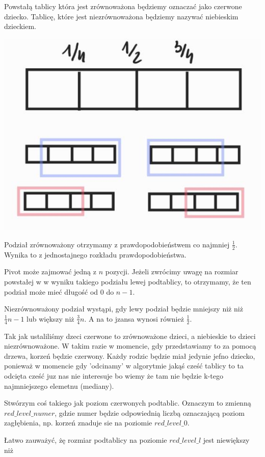 \documentclass[12pt]{article}
\begin{document}
Powstałą tablicy która jest zrównoważona będziemy oznaczać jako czerwone dziecko.
Tablicę, które jest niezrównoważona będziemy nazywać niebieskim dzieckiem.

\includegraphics[scale=0.5]{zad4_2.png}

Podział zrównoważony otrzymamy z prawdopodobieństwem co najmniej $\frac{1}{2}$. 
Wynika to z jednostajnego rozkładu prawdopodobieństwa. 

Pivot może zajmować jedną z $n$ pozycji. Jeżeli zwrócimy uwagę na rozmiar powstałej w w wyniku takiego podziału lewej podtablicy, to otrzymamy, że ten podział może mieć długość od $0$ do $n-1$.

Niezrównoważony podział wystąpi, gdy lewy podział będzie mniejszy niż niż $\frac{1}{4}n-1$ lub większy niż $\frac{3}{4}n$. A na to jzansa wynosi również $\frac{1}{2}$.

Tak jak ustaliliśmy dzeci czerwone to zrównoważone dzieci, a niebieskie to dzieci niezrównoważone. W takim razie w momencie, gdy przedstawiamy to za pomocą drzewa, korzeń będzie czerwony. Każdy rodzic będzie miał jedynie jefno dziecko, ponieważ w momencie gdy 'odcinamy' w algorytmie jakąś cześć tablicy to ta odcięta cześć juz nas nie interesuje bo wiemy że tam nie będzie k-tego najmniejszego elemetnu (mediany).

Stwórzym coś takiego jak poziom czerwonych podtablic.
Oznaczym to zmienną $red\_level\_numer$, gdzie numer będzie odpowiednią liczbą oznaczającą poziom zagłębienia, np. korzeń znaduje sie na poziomie $red\_level\_0$.

Łatwo zauważyć, żę rozmiar podtablicy na poziomie $red\_level\_l$ jest niewiększy niż
\end{document}
